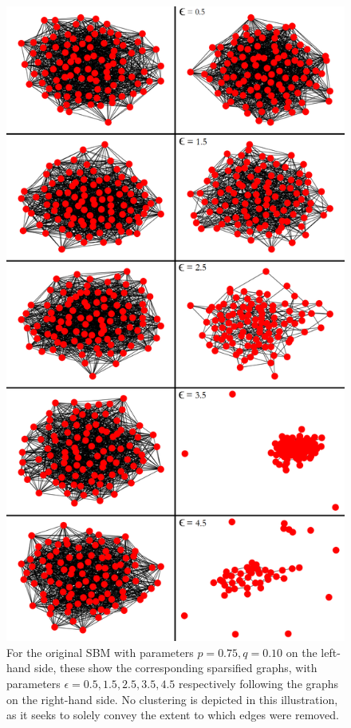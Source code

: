 \documentclass{article}
\begin{document}
\begin{figure}[H]
    \label{fig:results_original_vs_sparse}
    \centering
    \includegraphics[width=.75\textwidth]{results/results_original_vs_sparse.png}
    \caption[Sparsified graphs across $\epsilon$]{For the original SBM with parameters $p=0.75,q=0.10$ on the left-hand side, these show the corresponding sparsified graphs, with parameters $\epsilon=0.5,1.5,2.5,3.5,4.5$ respectively following the graphs on the right-hand side. No clustering is depicted in this illustration, as it seeks to solely convey the extent to which edges were removed.}
\end{figure}
\end{document}
